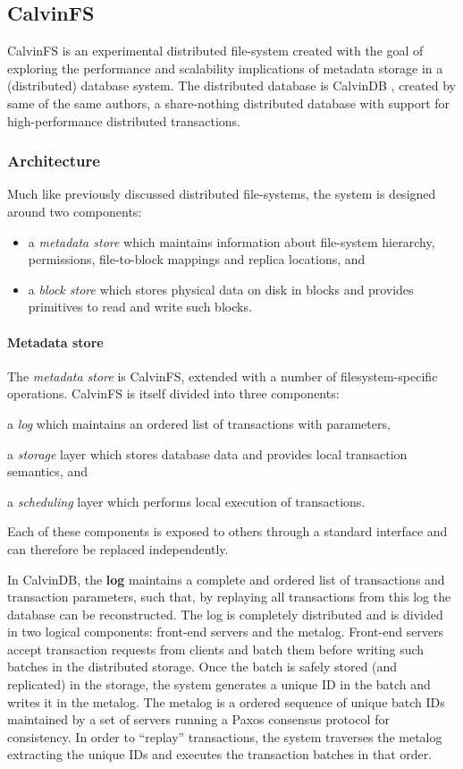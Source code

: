 \subsection{CalvinFS}
CalvinFS \cite{DBLP:conf/fast/ThomsonA15} is an experimental distributed file-system created with the goal of exploring the performance and scalability implications of metadata storage in a (distributed) database system.
The distributed database is CalvinDB \cite{DBLP:conf/sigmod/ThomsonDWRSA12}, created by same of the same authors, a share-nothing distributed database with support for high-performance distributed transactions.

\subsubsection{Architecture}
Much like previously discussed distributed file-systems, the system is designed around two components:
\begin{itemize}
    \item a \emph{metadata store} which maintains information about file-system hierarchy, permissions, file-to-block mappings and replica locations, and
    \item a \emph{block store} which stores physical data on disk in blocks and provides primitives to read and write such blocks.
\end{itemize}

\paragraph{Metadata store} The \emph{metadata store} is CalvinFS, extended with a number of filesystem-specific operations.
CalvinFS is itself divided into three components: \begin{inparaenum}[i)]
    \item a \emph{log} which maintains an ordered list of transactions with parameters,
    \item a \emph{storage} layer which stores database data and provides local transaction semantics, and
    \item a \emph{scheduling} layer which performs local execution of transactions.
\end{inparaenum}
Each of these components is exposed to others through a standard interface and can therefore be replaced independently.

In CalvinDB, the \textbf{log} maintains a complete and ordered list of transactions and transaction parameters, such that, by replaying all transactions from this log the database can be reconstructed.
The log is completely distributed and is divided in two logical components: front-end servers and the metalog.
Front-end servers accept transaction requests from clients and batch them before writing such batches in the distributed storage.
Once the batch is safely stored (and replicated) in the storage, the system generates a unique ID in the batch and writes it in the metalog.
The metalog is a ordered sequence of unique batch IDs maintained by a set of servers running a Paxos consensus protocol for consistency.
In order to ``replay'' transactions, the system traverses the metalog extracting the unique IDs and executes the transaction batches in that order.

